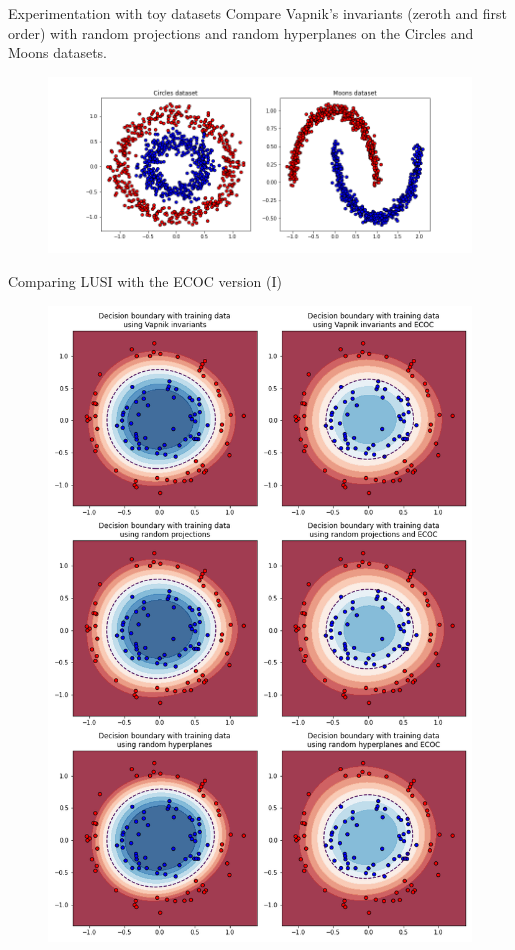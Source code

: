 \documentclass[10pt, dvipsnames]{beamer}
\begin{document}
\begin{frame}{Experimentation with toy datasets}
    Compare Vapnik's invariants (zeroth and first order) with random projections and random
    hyperplanes on the Circles and Moons datasets.
    
    \begin{figure}
        \centering
        \includegraphics[width=\textwidth]{presentation/figures/toy_datasets.png}
    \end{figure}
\end{frame}

\begin{frame}{Comparing LUSI with the ECOC version (I)}
    \begin{figure}
        \centering
        \includegraphics[width=.5\textwidth]{presentation/figures/comparative_circles.png}
    \end{figure}
\end{frame}
\end{document}
